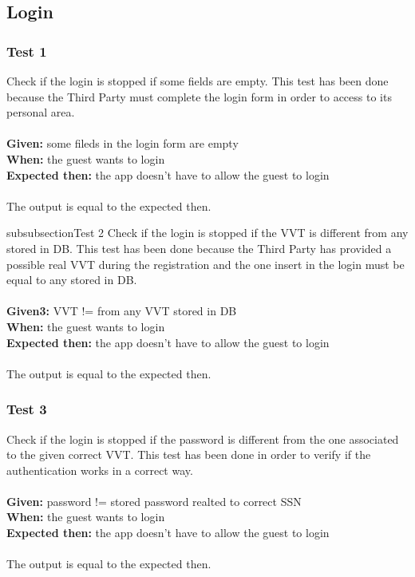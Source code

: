\subsection{Login}
\subsubsection{\Large{Test 1}}
Check if the login is stopped if some fields are empty. This test has been done because the Third Party must complete the login form in order to access to its personal area.\\
\\
\textbf{Given: } some fileds in the login form are empty\\
\textbf{When: } the guest wants to login\\
\textbf{Expected then: } the app doesn't have to allow the guest to login\\
\\
The output is equal to the expected then.

subsubsection{\Large{Test 2}}
Check if the login is stopped if the VVT is different from any stored in DB. This test has been done because the Third Party has provided a possible real VVT during the registration and the one insert in the login must be equal to any stored in DB.\\
\\
\textbf{Given3: } VVT != from any VVT stored in DB\\
\textbf{When: } the guest wants to login\\
\textbf{Expected then: } the app doesn't have to allow the guest to login\\
\\
The output is equal to the expected then.

\subsubsection{\Large{Test 3}}
Check if the login is stopped if the password is different from the one associated to the given correct VVT. This test has been done in order to verify if the authentication works in a correct way.\\
\\
\textbf{Given: } password != stored password realted to correct SSN\\
\textbf{When: } the guest wants to login\\
\textbf{Expected then: } the app doesn't have to allow the guest to login\\
\\
The output is equal to the expected then.

